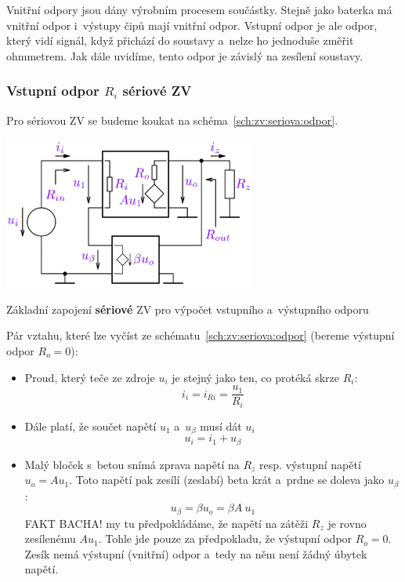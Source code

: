 \documentclass[a4paper,12pt]{article}   %
\begin{document}
Vnitřní odpory jsou dány výrobním procesem součástky. Stejně jako baterka má vnitřní odpor i~výstupy čipů mají vnitřní odpor. Vstupní odpor je ale odpor, který vidí signál, když přichází do soustavy a~nelze ho jednoduše změřit ohmmetrem. Jak dále uvidíme, tento odpor je závislý na zesílení soustavy.

\subsubsection*{Vstupní odpor $R_i$ sériové ZV}
Pro sériovou ZV se budeme koukat na schéma~\ref{sch:zv:seriova:odpor}.
\begin{schema}[h!]
    \centering
    \includegraphics[height=5cm]{ZV_seriova-odpory.PNG}
    \caption{Základní zapojení \textbf{sériové} ZV pro výpočet vstupního a~výstupního odporu}
    \label{sch:zv:seriova:odpor}
\end{schema}

Pár vztahu, které lze vyčíst ze schématu~\ref{sch:zv:seriova:odpor} (bereme výstupní odpor $R_o = 0$):
\begin{itemize}
    \item Proud, který teče ze zdroje $u_i$ je stejný jako ten, co protéká skrze $R_i$:
    \begin{equation}
        i_i = i_{Ri} = \frac{u_\text{1}}{R_i}
        \label{eq:ri}
    \end{equation}
    \item Dále platí, že součet napětí $u_\text{1}$ a~$u_\beta$ musí dát $u_i$
    \begin{equation}
        u_i = i_\text{1} + u_\beta
        \label{eq:soucet:napeti}
    \end{equation}
    \item Malý bloček s~betou snímá zprava napětí na $R_z$ resp. výstupní napětí $u_o = Au_\text{1}$. Toto napětí pak zesílí (zeslabí) beta krát a~prdne se doleva jako $u_\beta$:
    \begin{equation}
        u_\beta = \beta u_o = \beta A~u_\text{1}
        \label{eq:beta:napeti}
    \end{equation}
    FAKT BACHA! my tu předpokládáme, že napětí na zátěži $R_z$ je rovno zesílenému $Au_\text{1}$. Tohle jde pouze za předpokladu, že výstupní odpor $R_o = 0$. Zesík nemá výstupní (vnitřní) odpor a~tedy na něm není žádný úbytek napětí.
\end{itemize}
\end{document}
